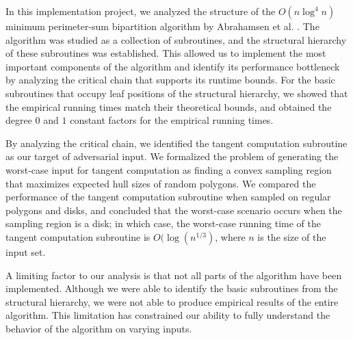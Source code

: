 \documentclass{article}
\begin{document}

In this implementation project, we analyzed the structure of the $O(n \log^4 n)$ minimum perimeter-sum bipartition algorithm by Abrahamsen et al. \cite{abb17}. The algorithm was studied as a collection of subroutines, and the structural hierarchy of these subroutines was established. This allowed us to implement the most important components of the algorithm and identify its performance bottleneck by analyzing the critical chain that supports its runtime bounds. For the basic subroutines that occupy leaf positions of the structural hierarchy, we showed that the empirical running times match their theoretical bounds, and obtained the degree $0$ and $1$ constant factors for the empirical running times.

By analyzing the critical chain, we identified the tangent computation subroutine as our target of adversarial input. We formalized the problem of generating the worst-case input for tangent computation as finding a convex sampling region that maximizes expected hull sizes of random polygons. We compared the performance of the tangent computation subroutine when sampled on regular polygons and disks, and concluded that the worst-case scenario occurs when the sampling region is a disk; in which case, the worst-case running time of the tangent computation subroutine is $O(\log(n^{1/3})$, where $n$ is the size of the input set.


A limiting factor to our analysis is that not all parts of the algorithm have been implemented. Although we were able to identify the basic subroutines from the structural hierarchy, we were not able to produce empirical results of the entire algorithm. This limitation has constrained our ability to fully understand the behavior of the algorithm on varying inputs.



\end{document}
